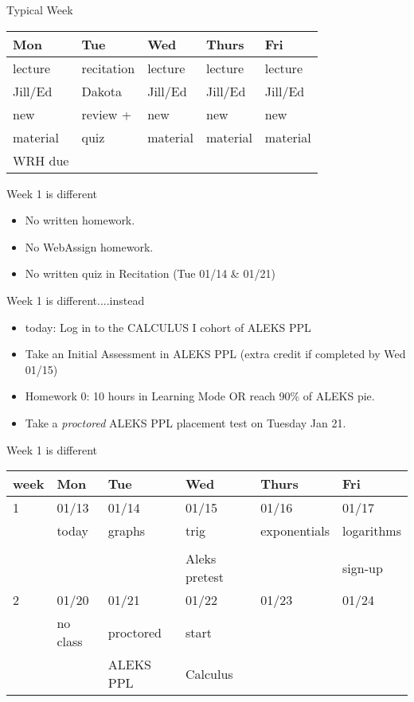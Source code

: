 \documentclass{beamer}
\begin{document}
\begin{frame}
Typical Week\\
\begin{center}
\begin{tabular}{lllll}
Mon&Tue&Wed&Thurs&Fri \\
\hline
lecture&recitation&lecture&lecture&lecture\\
\hline
Jill/Ed&Dakota&Jill/Ed&Jill/Ed&Jill/Ed\\
\hline
new& review +&new&new&new\\
material&quiz&material&material&material\\
\hline
WRH due&&&&\\
\end{tabular}
\end{center}
\end{frame}

\begin{frame}
Week 1 is different
	\begin{itemize}
	\item No written homework.
	\item No WebAssign homework.
	\item No written quiz in Recitation (Tue 01/14 \& 01/21)
	\end{itemize}
\end{frame}

\begin{frame}
Week 1 is different....instead
	\begin{itemize}
	\item today: Log in to the CALCULUS I cohort of ALEKS PPL
	\item Take an Initial Assessment in ALEKS PPL (extra credit if completed by Wed 01/15)
	\item Homework 0: 10 hours in Learning Mode OR reach 90\% of ALEKS pie.
	\item Take a \emph{proctored} ALEKS PPL placement test on Tuesday Jan 21.
	\end{itemize}
\end{frame}

\begin{frame}
Week 1 is different
\begin{center}
\begin{tabular}{llllll}
week&Mon&Tue&Wed&Thurs&Fri \\
\hline \hline
1&01/13&01/14&01/15&01/16&01/17\\
& today&graphs&trig&exponentials&logarithms\\
&&&&&\\
&&&Aleks pretest&&sign-up\\
\hline \hline
2&01/20&01/21&01/22&01/23&01/24\\
& no class&proctored& start&&\\
&&ALEKS PPL&Calculus&&\\
\end{tabular}
\end{center}
\end{frame}
\end{document}
